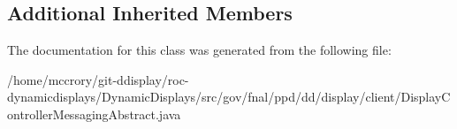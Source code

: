 \subsection*{Additional Inherited Members}


The documentation for this class was generated from the following file\-:\begin{DoxyCompactItemize}
\item 
/home/mccrory/git-\/ddisplay/roc-\/dynamicdisplays/\-Dynamic\-Displays/src/gov/fnal/ppd/dd/display/client/Display\-Controller\-Messaging\-Abstract.\-java\end{DoxyCompactItemize}
